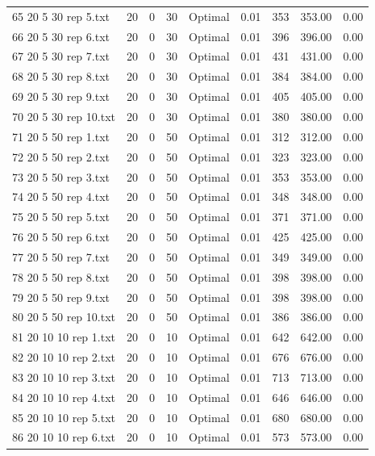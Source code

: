 \begin{longtable}{lrrllrrrr}
65 20 5 30 rep 5.txt & 20 & 0 & 30 & Optimal &  0.01 & 353 & 353.00 &  0.00\\
66 20 5 30 rep 6.txt & 20 & 0 & 30 & Optimal &  0.01 & 396 & 396.00 &  0.00\\
67 20 5 30 rep 7.txt & 20 & 0 & 30 & Optimal &  0.01 & 431 & 431.00 &  0.00\\
68 20 5 30 rep 8.txt & 20 & 0 & 30 & Optimal &  0.01 & 384 & 384.00 &  0.00\\
69 20 5 30 rep 9.txt & 20 & 0 & 30 & Optimal &  0.01 & 405 & 405.00 &  0.00\\
70 20 5 30 rep 10.txt & 20 & 0 & 30 & Optimal &  0.01 & 380 & 380.00 &  0.00\\
71 20 5 50 rep 1.txt & 20 & 0 & 50 & Optimal &  0.01 & 312 & 312.00 &  0.00\\
72 20 5 50 rep 2.txt & 20 & 0 & 50 & Optimal &  0.01 & 323 & 323.00 &  0.00\\
73 20 5 50 rep 3.txt & 20 & 0 & 50 & Optimal &  0.01 & 353 & 353.00 &  0.00\\
74 20 5 50 rep 4.txt & 20 & 0 & 50 & Optimal &  0.01 & 348 & 348.00 &  0.00\\
75 20 5 50 rep 5.txt & 20 & 0 & 50 & Optimal &  0.01 & 371 & 371.00 &  0.00\\
76 20 5 50 rep 6.txt & 20 & 0 & 50 & Optimal &  0.01 & 425 & 425.00 &  0.00\\
77 20 5 50 rep 7.txt & 20 & 0 & 50 & Optimal &  0.01 & 349 & 349.00 &  0.00\\
78 20 5 50 rep 8.txt & 20 & 0 & 50 & Optimal &  0.01 & 398 & 398.00 &  0.00\\
79 20 5 50 rep 9.txt & 20 & 0 & 50 & Optimal &  0.01 & 398 & 398.00 &  0.00\\
80 20 5 50 rep 10.txt & 20 & 0 & 50 & Optimal &  0.01 & 386 & 386.00 &  0.00\\
81 20 10 10 rep 1.txt & 20 & 0 & 10 & Optimal &  0.01 & 642 & 642.00 &  0.00\\
82 20 10 10 rep 2.txt & 20 & 0 & 10 & Optimal &  0.01 & 676 & 676.00 &  0.00\\
83 20 10 10 rep 3.txt & 20 & 0 & 10 & Optimal &  0.01 & 713 & 713.00 &  0.00\\
84 20 10 10 rep 4.txt & 20 & 0 & 10 & Optimal &  0.01 & 646 & 646.00 &  0.00\\
85 20 10 10 rep 5.txt & 20 & 0 & 10 & Optimal &  0.01 & 680 & 680.00 &  0.00\\
86 20 10 10 rep 6.txt & 20 & 0 & 10 & Optimal &  0.01 & 573 & 573.00 &  0.00\\

\end{longtable}

